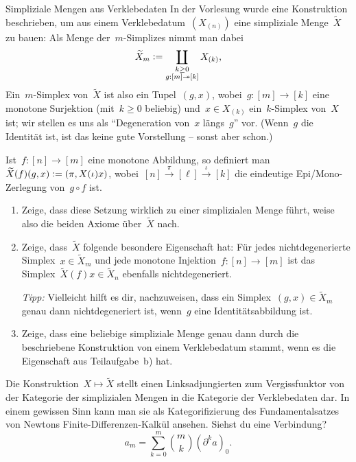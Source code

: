 \documentclass{uebblatt}
\begin{document}
\begin{aufgabe}{Simpliziale Mengen aus Verklebedaten}
In der Vorlesung wurde eine Konstruktion beschrieben, um aus einem
Verklebedatum~$(X_{(n)})$ eine simpliziale Menge~$\widetilde X$ zu bauen: Als
Menge der~$m$-Simplizes nimmt man dabei
\[ \widetilde X_m \vcentcolon= \coprod_{\substack{k \geq 0 \\ g : [m] \twoheadrightarrow [k]}} X_{(k)}, \]
Ein~$m$-Simplex von~$\widetilde X$ ist also ein Tupel~$(g,x)$, wobei~$g : [m]
\to [k]$ eine monotone Surjektion (mit~$k \geq 0$ beliebig) und~$x \in X_{(k)}$
ein~$k$-Simplex von~$X$ ist; wir stellen es uns als "`Degeneration von~$x$
längs~$g$"' vor. (Wenn~$g$ die Identität ist, ist das keine gute Vorstellung --
sonst aber schon.)

Ist~$f : [n] \to [m]$ eine monotone Abbildung, so definiert
man~$\widetilde X(f)(g,x) \vcentcolon= (\pi, X(\iota)x)$, wobei~$[n]
\xrightarrow{\pi} [\ell] \xrightarrow{\iota} [k]$ die eindeutige Epi/Mono-Zerlegung
von~$g \circ f$ ist.
\begin{enumerate}
\item Zeige, dass diese Setzung wirklich zu einer simplizialen Menge führt,
weise also die beiden Axiome über~$\widetilde X$ nach.
\item Zeige, dass~$\widetilde X$ folgende besondere Eigenschaft hat: Für jedes
nichtdegenerierte Simplex~$x \in \widetilde X_m$ und jede monotone Injektion~$f
: [n] \to [m]$ ist das Simplex~$\widetilde X(f)x \in \widetilde X_n$
ebenfalls nichtdegeneriert.

{\tiny\emph{Tipp:} Vielleicht hilft es dir, nachzuweisen, dass ein Simplex~$(g,x) \in
\widetilde X_m$ genau dann nichtdegeneriert ist, wenn~$g$ eine
Identitätsabbildung ist.\par}

\item Zeige, dass eine beliebige simpliziale Menge genau dann durch die
beschriebene Konstruktion von einem Verklebedatum stammt, wenn es die
Eigenschaft aus Teilaufgabe~b) hat.
\end{enumerate}

\begin{tiny}
Die Konstruktion~$X \mapsto \widetilde X$ stellt einen Linksadjungierten zum
Vergissfunktor von der Kategorie der simplizialen Mengen in die Kategorie der
Verklebedaten dar. In einem gewissen Sinn kann man sie als Kategorifizierung
des Fundamentalsatzes von Newtons Finite-Differenzen-Kalkül ansehen.
Siehst du eine Verbindung?
\[ a_m = \sum_{k=0}^m \binom{m}{k} (\partial^k a)_0. \]
\end{tiny}
\end{aufgabe}
\end{document}
